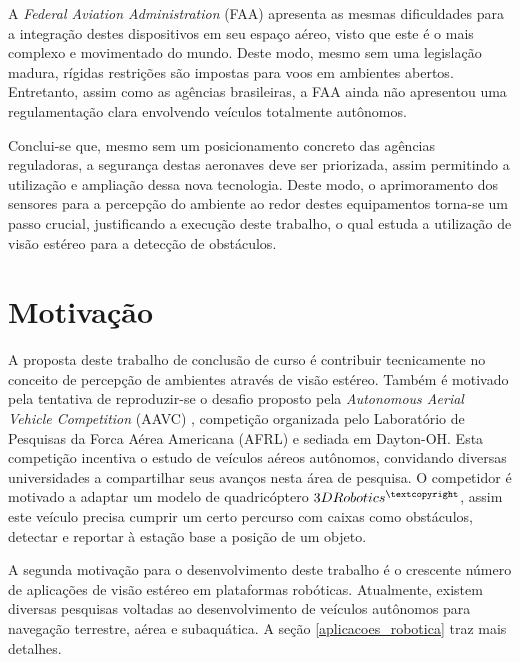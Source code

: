 A \textit{Federal Aviation Administration} (FAA) apresenta as mesmas dificuldades para a integração destes dispositivos em seu espaço aéreo, visto que este é o mais complexo e movimentado do mundo. Deste modo, mesmo sem uma legislação madura, rígidas restrições são impostas para voos em ambientes abertos. Entretanto, assim como as agências brasileiras, a FAA ainda não apresentou uma regulamentação clara envolvendo veículos totalmente autônomos. 

Conclui-se que, mesmo sem um posicionamento concreto das agências reguladoras, a segurança destas aeronaves deve ser priorizada, assim permitindo a utilização e ampliação dessa nova tecnologia. Deste modo, o aprimoramento dos sensores para a percepção do ambiente ao redor destes equipamentos torna-se um passo crucial, justificando a execução deste trabalho, o qual estuda a utilização de visão estéreo para a detecção de obstáculos.


\section{Motivação}

A proposta deste trabalho de conclusão de curso é contribuir tecnicamente no conceito de percepção de ambientes através de visão estéreo. Também é motivado pela tentativa de reproduzir-se o desafio proposto pela \textit{Autonomous Aerial Vehicle Competition} (AAVC) \cite{AAVC}, competição organizada pelo Laboratório de Pesquisas da Forca Aérea Americana (AFRL) e sediada em Dayton-OH. Esta competição incentiva o estudo de veículos aéreos autônomos, convidando diversas universidades a compartilhar seus avanços nesta área de pesquisa. O competidor é motivado a adaptar um modelo de quadricóptero $3DRobotics^{\textcopyright}$, assim este veículo precisa cumprir um certo percurso com caixas como obstáculos, detectar e reportar à estação base a posição de um objeto.

A segunda motivação para o desenvolvimento deste trabalho é o crescente número de aplicações de visão estéreo em plataformas robóticas. Atualmente, existem diversas pesquisas voltadas ao desenvolvimento de veículos autônomos para navegação terrestre, aérea e subaquática. A seção \ref{aplicacoes_robotica} traz mais detalhes.


